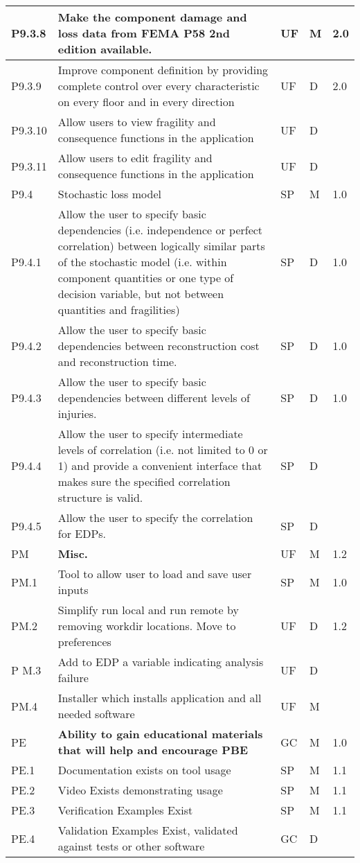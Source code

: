 \begin{longtable}{| p{} | p{} | p{} | p{} |  p{} |}
P9.3.8 & Make the component damage and loss data from FEMA P58 2nd edition available. & UF & M & 2.0 \\ \hline
P9.3.9 & Improve component definition by providing complete control over every characteristic on every floor and in every direction & UF & D & 2.0 \\ \hline
P9.3.10 & Allow users to view fragility and consequence functions in the application & UF & D &  \\ \hline
P9.3.11 & Allow users to edit fragility and consequence functions in the application & UF & D &  \\ \hline
P9.4 & Stochastic loss model & SP & M & 1.0 \\ \hline
P9.4.1 & Allow the user to specify basic dependencies (i.e. independence or perfect correlation) between logically similar parts of the stochastic model (i.e. within component quantities or one type of decision variable, but not between quantities and fragilities) & SP & D & 1.0 \\ \hline
P9.4.2 & Allow the user to specify basic dependencies between reconstruction cost and reconstruction time. & SP & D & 1.0 \\ \hline
P9.4.3 & Allow the user to specify basic dependencies between different levels of injuries. & SP & D & 1.0 \\ \hline
P9.4.4 & Allow the user to specify intermediate levels of correlation (i.e. not limited to 0 or 1) and provide a convenient interface that makes sure the specified correlation structure is valid. & SP & D & \\ \hline   
P9.4.5 & Allow the user to specify the correlation for EDPs. & SP & D &  \\ \hhline{=====}

 PM & \textbf{Misc.} & UF & M & 1.2  \\ \hline
    PM.1 & Tool to allow user to load and save user inputs & SP & M & 1.0 \\ \hline
   PM.2 & Simplify run local and run remote by removing workdir locations. Move to preferences & UF & D & 1.2  \\ \hline
  P M.3 & Add to EDP a variable indicating analysis failure & UF & D &   \\ \hline
   PM.4 & Installer which installs application and all needed software & UF & M &   \\ \hhline{=====}
 PE & \textbf{Ability to gain educational materials that will help and encourage PBE} & GC  & M & 1.0 \\ \hline
 PE.1 & Documentation exists on tool usage & SP & M & 1.1  \\ \hline
 PE.2 & Video Exists demonstrating usage & SP & M & 1.1  \\ \hline
 PE.3 & Verification Examples Exist & SP & M & 1.1  \\ \hline
 PE.4 & Validation Examples Exist, validated against tests or other software & GC & D &  \\ \hline
  \bottomrule               
\end{longtable}


